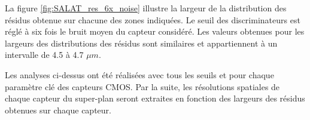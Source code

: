    \medskip
   
   La figure \ref{fig:SALAT_res_6x_noise} illustre la largeur de la distribution des r\'esidus obtenue sur chacune des zones indiqu\'ees. Le seuil des discriminateurs est r\'egl\'e \`a six fois le bruit moyen du capteur consid\'er\'e. Les valeurs obtenues pour les largeurs des distributions des r\'esidus sont similaires et appartiennent \`a un intervalle de 4.5 \`a 4.7 $\mu m$.
   
%    
%    
  
  Les analyses ci-dessus ont \'et\'e r\'ealis\'ees avec tous les seuils et pour chaque param\`etre cl\'e des capteurs CMOS. Par la suite, les r\'esolutions spatiales de chaque capteur du super-plan seront extraites en fonction des largeurs des r\'esidus obtenues sur chaque capteur.

